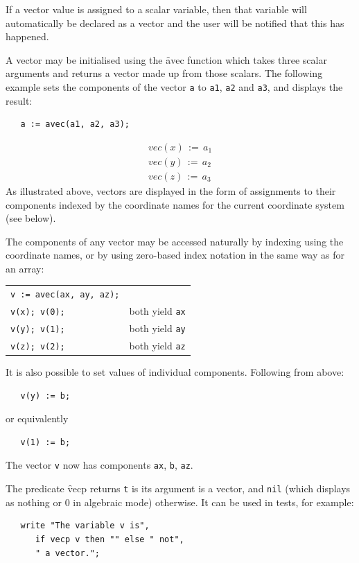 If a vector value is assigned to a scalar variable, then that
variable will automatically be declared as a vector and the
user will be notified that this has happened.

\hypertarget{operator:AVEC}{}
A vector may be initialised using the \f{avec} function which takes
three scalar arguments and returns a vector made up from those
scalars. The following example sets the components of the
vector \texttt{a} to \texttt{a1}, \texttt{a2} and \texttt{a3}, and
displays the result:
\begin{verbatim}
   a := avec(a1, a2, a3);
\end{verbatim}
\begin{gather*}
vec(x)\,:=\,\mathit{a_{1}}\\
vec(y)\,:=\,\mathit{a_{2}}\\
vec(z)\,:=\,\mathit{a_{3}}
\end{gather*}
As illustrated above, vectors are displayed in the form of assignments
to their components indexed by the coordinate names for the current
coordinate system (see below).

The components of any vector may be accessed naturally by indexing
using the coordinate names, or by using zero-based index notation in
the same way as for an array:

\begin{tabular}{l|l}
\multicolumn{1}{l}{\texttt{v := avec(ax, ay, az);}} \\
\texttt{v(x); v(0);} & both yield \texttt{ax} \\
\texttt{v(y); v(1);} & both yield \texttt{ay} \\
\texttt{v(z); v(2);} & both yield \texttt{az}
\end{tabular}

It is also possible to set values of individual components.  Following
from above:
\begin{verbatim}
   v(y) := b;
\end{verbatim}
or equivalently
\begin{verbatim}
   v(1) := b;
\end{verbatim}
The vector \texttt{v} now has
components \texttt{ax}, \texttt{b}, \texttt{az}.

The predicate \f{vecp} returns \texttt{t} is its argument is a vector,
and \texttt{nil} (which displays as nothing or 0 in algebraic mode)
otherwise.  It can be used in tests, for example:
\begin{verbatim}
   write "The variable v is",
      if vecp v then "" else " not",
      " a vector.";
\end{verbatim}


